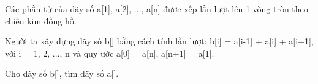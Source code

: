 Các phần tử của dãy số a[1], a[2], ..., a[n] được xếp lần lượt lên 1 vòng tròn theo chiều kim đồng hồ.  

   Người ta xây dựng dãy số b[] bằng cách tính lần lượt: b[i] = a[i-1] + a[i] + a[i+1], với i = 1, 2, ..., n và quy ước a[0] = a[n], a[n+1] = a[1].  

   Cho dãy số b[], tìm dãy số a[].  

\